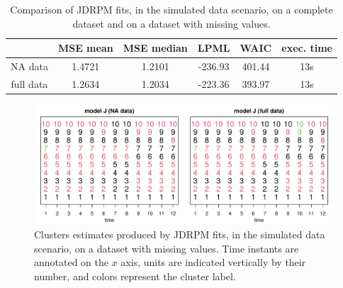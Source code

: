 \documentclass[12pt,	%
	a4paper,		%
	twoside,		%
	openright,		%
	titlepage,%
	]{book}
\theoremstyle{definition}
\begin{document}

\begin{table}[!ht]
    \caption[Comparison of JDRPM, simulated data scenario, dataset with missing values]{Comparison of JDRPM fits, in the simulated data scenario, on a complete dataset and on a dataset with missing values.}
    \centering
    \begin{tabular}{cccccc}
    \toprule
            & MSE mean &  MSE median & LPML & WAIC & exec. time  \\
           \midrule
        NA data &   1.4721   & 1.2101 & -236.93 & 401.44 & 13s\\
        full data& 1.2634 & 1.2034  & -223.36 & 393.97  &  13s \\
        \bottomrule
    \end{tabular}
    \label{tab: fits metrics no space julias na full}
\end{table}


\begin{figure}[!ht]
    \centering
    \includegraphics[width=1\linewidth]{Testing/NA data/no space NA/partizioni_nums.pdf}
    \caption[Clusters estimates of JDRPM, simulated data scenario, dataset with missing values]{Clusters estimates produced by JDRPM fits, in the simulated data scenario, on a dataset with missing values. Time instants are annotated on the $x$ axis, units are indicated vertically by their number, and colors represent the cluster label.}
    \label{fig: partizioni no space NA}
\end{figure}
\end{document}
